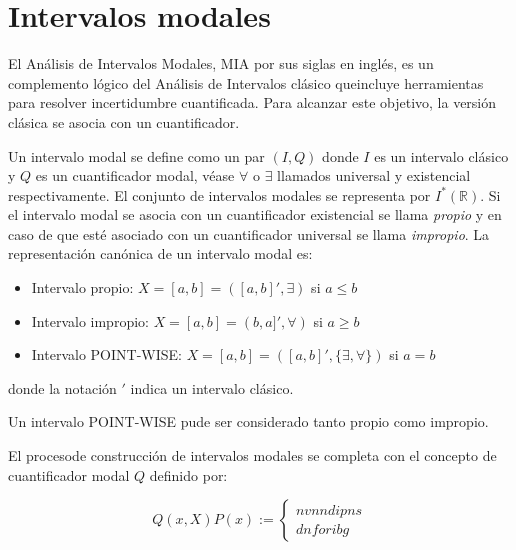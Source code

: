 \section{Intervalos modales}

El Análisis de Intervalos Modales, MIA por sus siglas en inglés, es un complemento lógico del Análisis de Intervalos clásico queincluye herramientas para resolver incertidumbre cuantificada. Para alcanzar este objetivo, la versión clásica se asocia con un cuantificador.
\par Un intervalo modal se define como un par $(I,Q)$ donde $I$ es un intervalo clásico y $Q$ es un cuantificador modal, véase $\forall$ o $\exists$ llamados universal y existencial respectivamente. El conjunto de intervalos modales se representa por $I^*(\mathbb{R})$. Si el intervalo modal se asocia con un cuantificador existencial se llama{ \em propio} y en caso de que esté asociado con un cuantificador universal se llama{ \em impropio}. La representación canónica de un intervalo modal es:

\begin{itemize}
	\item Intervalo propio: $X = [a,b] = ([a,b]',\exists)$ si $a \leq b$
	\item Intervalo impropio: $X = [a,b] = (b,a]',\forall)$ si $a \geq b$
	\item Intervalo POINT-WISE: $X = [a,b] = ([a,b]',\{ \exists, \forall \})$ si $a = b$
\end{itemize}

donde la notación $'$ indica un intervalo clásico.
\par Un intervalo POINT-WISE pude ser considerado tanto propio como impropio.
\par El procesode construcción de intervalos modales se completa con el concepto de cuantificador modal $Q$ definido por:

\begin{equation}
Q(x,X)P(x) := \left\{ \begin{split}
nvnndipns \\ dnforibg
\end{split} \right.
\nonumber
\end{equation}
